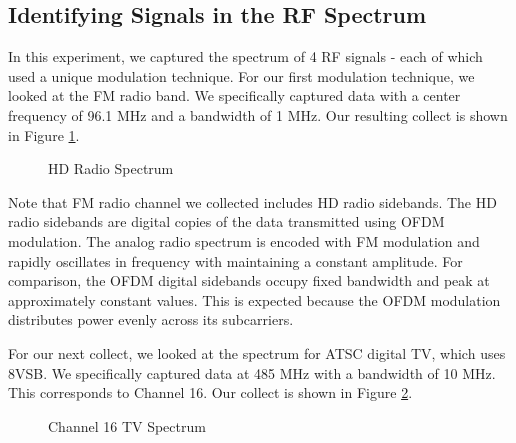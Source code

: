\documentclass{article}
\begin{document}
\subsection{Identifying Signals in the RF Spectrum}

In this experiment, we captured the spectrum of 4 RF signals - each of which used a unique modulation technique. For our first modulation technique, we looked at the FM radio band. We specifically captured data with a center frequency of 96.1 MHz and a bandwidth of 1 MHz. Our resulting collect is shown in Figure \ref{fig::hd_radio_spectrum}.

\begin{figure}[H]
	\centerline{}
	\caption{HD Radio Spectrum}
	\label{fig::hd_radio_spectrum}
\end{figure}


Note that FM radio channel we collected includes HD radio sidebands. The HD radio sidebands are digital copies of the data transmitted using OFDM modulation. The analog radio spectrum is encoded with FM modulation and rapidly oscillates in frequency with maintaining a constant amplitude. For comparison, the OFDM digital sidebands occupy fixed bandwidth and peak at approximately constant values. This is expected because the OFDM modulation distributes power evenly across its subcarriers.

For our next collect, we looked at the spectrum for ATSC digital TV, which uses 8VSB. We specifically captured data at 485 MHz with a bandwidth of 10 MHz. This corresponds to Channel 16. Our collect is shown in Figure \ref{fig::8vsb_spectrum}.

\begin{figure}[H]
	\centerline{}
	\caption{Channel 16 TV Spectrum}
	\label{fig::8vsb_spectrum}
\end{figure}
\end{document}
